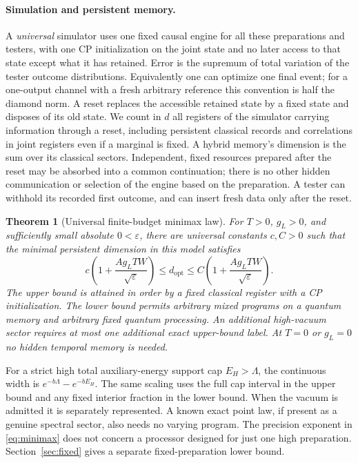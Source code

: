 \documentclass[11pt]{article}
\newtheorem{theorem}{Theorem}
\theoremstyle{remark}
\begin{document}
\paragraph{Simulation and persistent memory.}
A \emph{universal} simulator uses one fixed causal engine for all
these preparations and testers, with one CP initialization on the
joint state and no later access to that state except what it has
retained. Error is the supremum of total variation of the tester
outcome distributions. Equivalently one can optimize one final
event; for a one-output channel with a fresh arbitrary reference
this convention is half the diamond norm. A reset replaces the
accessible retained state by a fixed state and disposes of its old
state. We count in \(d\) all registers of the simulator carrying
information through a reset, including persistent classical
records and correlations in joint registers even if a marginal is
fixed. A hybrid memory's dimension is the sum over its classical
sectors. Independent, fixed resources prepared after the reset may
be absorbed into a common continuation; there is no other hidden
communication or selection of the engine based on the preparation.
A tester can withhold its recorded first outcome, and can insert
fresh data only after the reset.

\begin{theorem}[Universal finite-budget minimax law]\label{thm:univ}
For \(T>0\), \(g_L>0\), and sufficiently small absolute
\(0<\varepsilon\), there are universal constants \(c,C>0\) such that
the minimal persistent dimension in this model satisfies
\begin{equation}\label{eq:minimax}
 c\left(1+\frac{A g_LTW}{\sqrt{\varepsilon}}\right)
 \le d_{\mathrm{opt}}
 \le C\left(1+\frac{A g_LTW}{\sqrt{\varepsilon}}\right).
\end{equation}
The upper bound is attained in order by a fixed classical register
with a CP initialization. The lower bound permits arbitrary
mixed programs on a quantum memory and arbitrary fixed quantum
processing. An additional high-vacuum sector requires at most
one additional exact upper-bound label. At \(T=0\) or \(g_L=0\) no
hidden temporal memory is needed.
\end{theorem}

For a strict high total auxiliary-energy support cap \(E_H>\Lambda\),
the continuous width is \(e^{-b\Lambda}-e^{-bE_H}\). The same scaling
uses the full cap interval in the upper bound and any fixed interior
fraction in the lower bound. When the vacuum is admitted it is
separately represented. A known exact point law, if present as a
genuine spectral sector, also needs no varying program. The precision
exponent in \eqref{eq:minimax} does not concern a processor designed
for just one high preparation. Section~\ref{sec:fixed} gives a
separate fixed-preparation lower bound.
\end{document}
